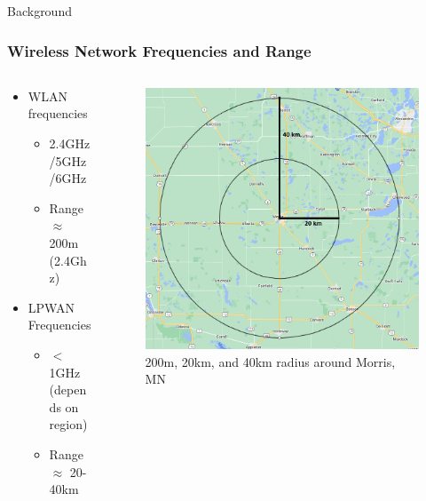 \documentclass{beamer}
\begin{document}
\begin{frame}{Background}
  \frametitle{Wireless Network Frequencies and Range}
  \begin{columns}
    \begin{column}{0.5\textwidth}
      \begin{itemize}
        \item WLAN frequencies
          \begin{itemize}
            \item 2.4GHz/5GHz/6GHz
            \item Range $\approx$ 200m (2.4Ghz)
          \end{itemize}
        \item LPWAN Frequencies
          \begin{itemize}
            \item $<$1GHz (depends on region)
            \item Range $\approx$ 20-40km
          \end{itemize}
      \end{itemize}
    \end{column}
    \begin{column}{0.5\textwidth}
      \begin{figure}[htbp]
        \centering
        \includegraphics[width=.9\textwidth]{images/Range_comparisons.png}
        \caption{200m, 20km, and 40km radius around Morris, MN}
        \label{fig:Range_map}
      \end{figure}
  \end{column}
  \end{columns}
\end{frame}
\end{document}
